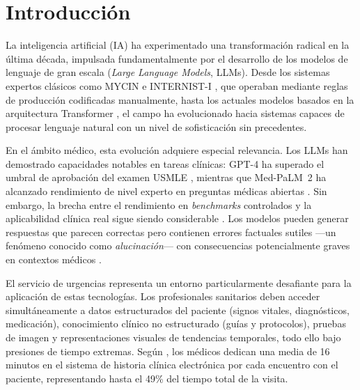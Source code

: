

\section{Introducción}
\label{sec:introduccion_contexto}

La inteligencia artificial (\acs{IA}) ha experimentado una transformación radical en la última década, impulsada fundamentalmente por el desarrollo de los modelos de lenguaje de gran escala (\textit{Large Language Models}, \acs{LLM}s). Desde los sistemas expertos clásicos como MYCIN \parencite{shortliffe1976} e INTERNIST-I \parencite{miller1982}, que operaban mediante reglas de producción codificadas manualmente, hasta los actuales modelos basados en la arquitectura Transformer \parencite{vaswani2017attention}, el campo ha evolucionado hacia sistemas capaces de procesar lenguaje natural con un nivel de sofisticación sin precedentes.

En el ámbito médico, esta evolución adquiere especial relevancia. Los \ac{LLM}s han demostrado capacidades notables en tareas clínicas: \acs{GPT}-4 ha superado el umbral de aprobación del examen \ac{USMLE} \parencite{openai2023}, mientras que Med-PaLM~2 ha alcanzado rendimiento de nivel experto en preguntas médicas abiertas \parencite{singhal2023medpalm}. Sin embargo, la brecha entre el rendimiento en \textit{benchmarks} controlados y la aplicabilidad clínica real sigue siendo considerable \parencite{park2024,wang2024chatgpt}. Los modelos pueden generar respuestas que parecen correctas pero contienen errores factuales sutiles ---un fenómeno conocido como \emph{alucinación}--- con consecuencias potencialmente graves en contextos médicos \parencite{kim2025hallucination}.

El servicio de urgencias representa un entorno particularmente desafiante para la aplicación de estas tecnologías. Los profesionales sanitarios deben acceder simultáneamente a datos estructurados del paciente (signos vitales, diagnósticos, medicación), conocimiento clínico no estructurado (guías y protocolos), pruebas de imagen y representaciones visuales de tendencias temporales, todo ello bajo presiones de tiempo extremas. Según \textcite{arun2025ethical}, los médicos dedican una media de 16 minutos en el sistema de historia clínica electrónica por cada encuentro con el paciente, representando hasta el 49\% del tiempo total de la visita.

